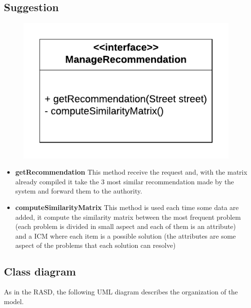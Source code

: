 \documentclass[12pt,a4paper]{report}
\begin{document}
			\subsection{Suggestion}
				\begin{figure}[H]
						\includegraphics [center]{recommendationInterface}
						\label{fig: interfaces}
				\end{figure}
				\begin{itemize}
					\item \textbf{getRecommendation} This method receive the request and, with the matrix already
						compiled it take the 3 most similar recommendation made by the system and forward them to the
						authority.
					\item \textbf{computeSimilarityMatrix} This method is used each time some data are added, it compute
					the similarity matrix between the most frequent problem (each problem is divided in small aspect and
					each of them is an attribute) and a ICM where each item is a possible solution (the attributes are some
					aspect of the problems that each solution can resolve)
				\end{itemize}
	
	\subsection{Class diagram}
	As in the RASD, the following UML diagram describes the organization of the model.
\end{document}
